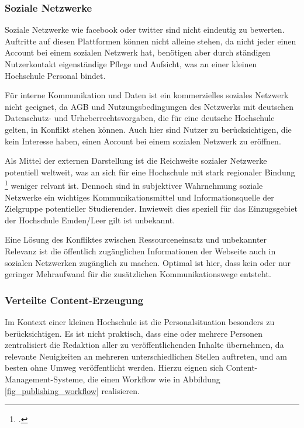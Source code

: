 \subsubsection{Soziale Netzwerke}
Soziale Netzwerke wie facebook oder twitter sind nicht eindeutig zu bewerten. Auftritte auf diesen Plattformen können nicht alleine stehen, da nicht jeder einen Account bei einem sozialen Netzwerk hat, benötigen aber durch ständigen Nutzerkontakt eigenständige Pflege und Aufsicht, was an einer kleinen Hochschule Personal bindet.

Für interne Kommunikation und Daten ist ein kommerzielles soziales Netzwerk nicht geeignet, da AGB und Nutzungsbedingungen des Netzwerks mit deutschen Datenschutz- und Urheberrechtsvorgaben, die für eine deutsche Hochschule gelten, in Konflikt stehen können. Auch hier sind Nutzer zu berücksichtigen, die kein Interesse haben, einen Account bei einem sozialen Netzwerk zu eröffnen.

Als Mittel der externen Darstellung ist die Reichweite sozialer Netzwerke potentiell weltweit, was an sich für eine Hochschule mit stark regionaler Bindung \footcite[Vgl.][]{hsel_leitbild_url} weniger relvant ist. Dennoch sind in subjektiver Wahrnehmung soziale Netzwerke ein wichtiges Kommunikationsmittel und Informationsquelle der Zielgruppe potentieller Studierender. Inwieweit dies speziell für das Einzugsgebiet der Hochschule Emden/Leer gilt ist unbekannt.

Eine Lösung des Konfliktes zwischen Ressourceneinsatz und unbekannter Relevanz ist die öffentlich zugänglichen Informationen der Webseite auch in sozialen Netzwerken zugänglich zu machen. Optimal ist hier, dass kein oder nur geringer Mehraufwand für die zusätzlichen Kommunikationswege entsteht.

\subsubsection{Verteilte Content-Erzeugung}
Im Kontext einer kleinen Hochschule ist die Personalsituation besonders zu berücksichtigen. Es ist nicht praktisch, dass eine oder mehrere Personen zentralisiert die Redaktion aller zu veröffentlichenden Inhalte übernehmen, da relevante Neuigkeiten an mehreren unterschiedlichen Stellen auftreten, und am besten ohne Umweg veröffentlicht werden. Hierzu eignen sich Content-Management-Systeme, die einen Workflow wie in Abbildung \ref{fig_publishing_workflow} realisieren.

